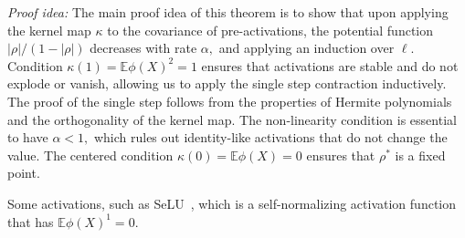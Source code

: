 \documentclass[twoside]{article}
\newcommand{\E}{\mathbb{E}}
\theoremstyle{definition}
\begin{document}
\textit{Proof idea:} The main proof idea of this theorem is to show that upon applying the kernel map $\kappa$ to the covariance of pre-activations, the potential function $|\rho|/(1-|\rho|)$ decreases with rate $\alpha,$ and applying an induction over $\ell.$ Condition $\kappa(1)=\E \phi(X)^2 = 1$ ensures that activations are stable and do not explode or vanish, allowing us to apply the single step contraction inductively. The proof of the single step follows from the properties of Hermite polynomials and the orthogonality of the kernel map. The non-linearity condition is essential to have $\alpha<1,$ which rules out identity-like activations that do not change the value. The centered condition $\kappa(0)=\E \phi(X) = 0$ ensures that $\rho^*$ is a fixed point.

Some activations, such as SeLU~\citet{klambauer2017self}, which is a self-normalizing activation function that has $\E \phi(X)^1 = 0.$ 

\end{document}
